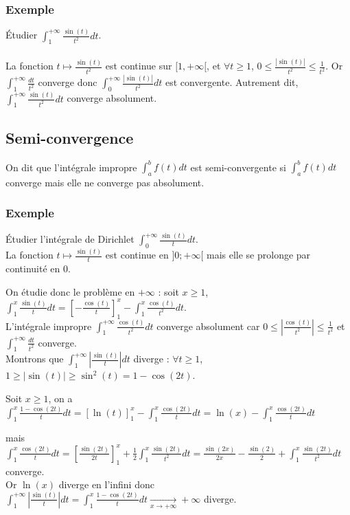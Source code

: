 \documentclass[a4paper,10pt]{book} %
\newcommand{\abs}[1]{\left|#1\right|}
\newcommand{\displayAmath}{\displaystyle}
\begin{document}
\subsubsection{Exemple}
Étudier $\displayAmath\int_1^{+\infty}\frac{\sin(t)}{t^2}dt$.\\\\
La fonction $t\mapsto \frac{\sin(t)}{t^2}$ est continue sur $[1,+\infty[$, et $\forall t\geq 1$, $0\leq \frac{\abs{\sin(t)}}{t^2}\leq \frac{1}{t^2}$.
Or $\displayAmath\int_1^{+\infty}\frac{dt}{t^2}$ converge donc $\displayAmath\int_0^{+\infty}\frac{\abs{\sin(t)}}{t^2}dt$ est convergente.
Autrement dit, $\displayAmath\int_1^{+\infty}\frac{\sin(t)}{t^2}dt$ converge absolument.

\subsection{Semi-convergence}
On dit que l'intégrale impropre $\displayAmath\int_a^bf(t)dt$ est semi-convergente si $\displayAmath\int_a^bf(t)dt$ converge mais elle ne converge pas absolument.

\subsubsection{Exemple}
Étudier l'intégrale de Dirichlet $\displayAmath\int_0^{+\infty}\frac{\sin(t)}{t}dt$.\\
La fonction $t\mapsto \frac{\sin(t)}{t}$ est continue en $]0;+\infty[$ mais elle se prolonge par continuité en 0.

On étudie donc le problème en $+\infty$ :
soit $x\geq 1$, $\displayAmath\int_1^x\frac{\sin(t)}{t}dt= \left[-\frac{\cos(t)}{t}\right]_1^x-\int_1^x\frac{\cos(t)}{t^2}dt$.\\
L'intégrale impropre $\displayAmath\int_1^{+\infty} \frac{\cos(t)}{t^2}dt$ converge absolument car $0\leq \abs{\frac{\cos(t)}{t^2}}\leq \frac{1}{t^2}$ et $\displayAmath\int_1^{+\infty} \frac{dt}{t^2}$ converge.\\
Montrons que $\displayAmath\int_1^{+\infty}\abs{\frac{\sin(t)}{t}}dt$ diverge : $\forall t\geq 1$, $1\geq \abs{\sin(t)}\geq \sin^2(t)=1-\cos(2t)$.

Soit $x\geq 1$, on a $\displayAmath\int_1^x \frac{1-\cos(2t)}{t}dt=[\ln(t)]_1^x-\int_1^x\frac{\cos(2t)}{t}dt= \ln(x)-\int_1^x\frac{\cos(2t)}{t}dt$

mais $\displayAmath\int_1^x\frac{\cos(2t)}{t}dt=\left[\frac{\sin(2t)}{2t}\right]_1^x+\frac{1}{2}\int_1^x\frac{\sin(2t)}{t^2}dt= \frac{\sin(2x)}{2x}-\frac{\sin(2)}{2}+\int_1^x\frac{\sin(2t)}{t^2}dt$ converge.\\
Or $\ln(x)$ diverge en l'infini donc $\displayAmath\int_1^{+\infty}\abs{\frac{\sin(t)}{t}}dt=\int_1^x\frac{1-\cos(2t)}{t}dt\underset{x\rightarrow +\infty}{\rightarrow}+\infty$ diverge.
\end{document}
